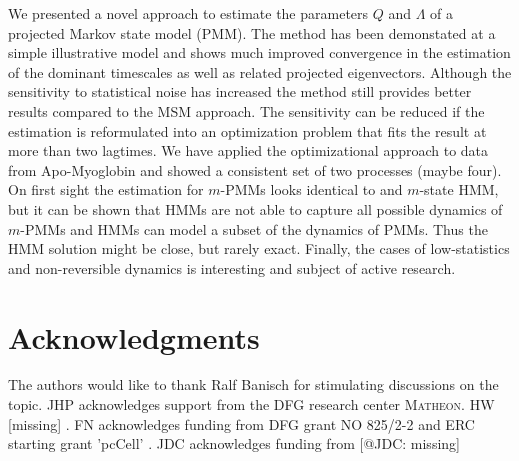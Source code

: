 \documentclass[aps,pre,twocolumn,nofootinbib,superscriptaddress,linenumbers]{revtex4-1}
\begin{document}
We presented a novel approach to estimate the parameters $Q$ and
$\Lambda$ of a projected Markov state model (PMM). The method has
been demonstated at a simple illustrative model and shows much improved
convergence in the estimation of the dominant timescales as well as
related projected eigenvectors. Although the sensitivity to statistical
noise has increased the method still provides better results compared
to the MSM approach. The sensitivity can be reduced if the estimation
is reformulated into an optimization problem that fits the result
at more than two lagtimes. We have applied the optimizational approach
to data from Apo-Myoglobin and showed a consistent set of two processes
(maybe four). On first sight the estimation for $m$-PMMs looks identical
to and $m$-state HMM, but it can be shown that HMMs are not able
to capture all possible dynamics of $m$-PMMs and HMMs can model a
subset of the dynamics of PMMs. Thus the HMM solution might be close,
but rarely exact\cite{Noe:2013tx}. Finally, the cases of low-statistics
and non-reversible dynamics is interesting and subject of active research.





\section{Acknowledgments}
\label{section:acknowledgments}

The authors would like to thank Ralf Banisch for stimulating discussions
on the topic. JHP acknowledges support from the DFG research center
\textsc{Matheon}. HW {[}missing{]} . FN acknowledges funding from
DFG grant NO 825/2-2 and ERC starting grant 'pcCell' \textquotedbl{}.
JDC acknowledges funding from {[}@JDC: missing{]}



% 

\end{document}
